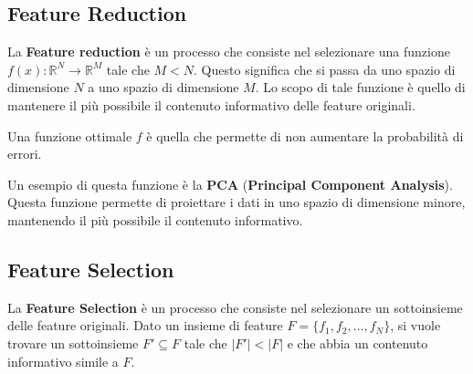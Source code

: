 \subsection{Feature Reduction}
La \textbf{Feature reduction} è un processo che consiste nel selezionare una
funzione $f(x): \mathbb{R}^N \to \mathbb{R}^M$ tale che $M < N$. Questo
significa che si passa da uno spazio di dimensione $N$ a uno spazio di dimensione
$M$. Lo scopo di tale funzione è quello di mantenere il più possibile il
contenuto informativo delle feature originali.

Una funzione ottimale $f$ è quella che permette di non aumentare la probabilità
di errori.

Un esempio di questa funzione è la \textbf{PCA} (\textbf{Principal Component
      Analysis}). Questa funzione permette di proiettare i dati in uno spazio di
dimensione minore, mantenendo il più possibile il contenuto informativo.
\subsection{Feature Selection}
La \textbf{Feature Selection} è un processo che consiste nel selezionare un
sottoinsieme delle feature originali. Dato un insieme di feature $F = \{f_1, f_2,
      \ldots, f_N\}$, si vuole trovare un sottoinsieme $F' \subseteq F$ tale che
$|F'| < |F|$ e che abbia un contenuto informativo simile a $F$.

